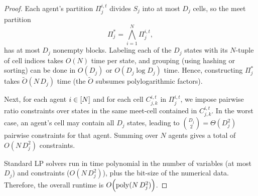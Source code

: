 \begin{proof}
Each agent’s partition $\Pi_j^{i,t}$ divides $S_j$ into at most $D_j$ cells, so the meet partition
\begin{equation*}
\Pi_j^*=\bigwedge_{i=1}^N \Pi_j^{i,t},
\end{equation*}
has at most $D_j$ nonempty blocks.
Labeling each of the $D_j$ states with its $N$-tuple of cell indices takes $O(N)$ time per state, and grouping (using hashing or sorting) can be done in $O(D_j)$ or $O(D_j\log D_j)$ time. 
Hence, constructing $\Pi_j^*$ takes $\tilde{O}(N\,D_j)$ time (the $\tilde{O}$ subsumes polylogarithmic factors).

Next, for each agent $i\in[N]$ and for each cell $C_{j,k}^{i,t}$ in $\Pi_j^{i,t}$, we impose pairwise ratio constraints over states in the same meet-cell contained in $C_{j,k}^{i,t}$. 
In the worst case, an agent's cell may contain all $D_j$ states, leading to $\binom{D_j}{2} = \Theta(D_j^2)$ pairwise constraints for that agent. 
Summing over $N$ agents gives a total of $O(N\,D_j^2)$ constraints.

Standard LP solvers run in time polynomial in the number of variables (at most $D_j$) and constraints ($O(N\,D_j^2)$), plus the bit-size of the numerical data.
Therefore, the overall runtime is $O\Bigl(\mathrm{poly}(N\,D_j^2)\Bigr)$.
\end{proof}

